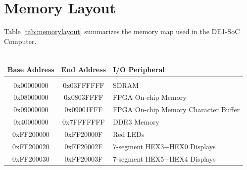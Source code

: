 \documentclass[11pt, twoside, pdftex]{article}
\newcommand{\commonFiles}{../../../common/doc}
\newcommand{\systemName}{DE1-SoC Computer}
\begin{document}


\section{Memory Layout}

\noindent
Table \ref{tab:memorylayout} summarizes the memory map used in the \systemName.
~\\
~\\

\begin{table}[h]
    \begin{center}
    \begin{tabular}{c|c|l}
            \textbf{Base Address}
            & \textbf{End Address}
            & \textbf{I/O Peripheral}
				\\\hline\vspace{-3mm}\\
            0x00000000
            & 0x03FFFFFF
            & SDRAM
        \\
            0x08000000
            & 0x0803FFFF
            & FPGA On-chip Memory
        \\
            0x09000000
            & 0x09001FFF
            & FPGA On-chip Memory Character Buffer
        \\
            0x40000000
            & 0x7FFFFFFF
            & DDR3 Memory
        \\
            0xFF200000
            & 0xFF20000F
            & Red LEDs
        \\
            0xFF200020
            & 0xFF20002F
            & 7-segment HEX3$-$HEX0 Displays
        \\
            0xFF200030
            & 0xFF20003F
            & 7-segment HEX5$-$HEX4 Displays


\end{tabular}
\end{center}
\end{table}
\end{document}
